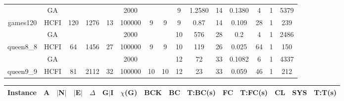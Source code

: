 \documentclass[10pt]{article}
\begin{document}
\begin{center}
\begin{table}[H]
\begin{tabular}{|c|c|c|c|c|c|c|c|c|c|c|c|c|c|c|}
	&GA&       &                   &                     &2000         &     \cellcolor{yellow} & {\cellcolor{yellow}}& {{\cellcolor{green}9}}
&1.2580   &14        &0.1380                   & 4                   &1          &5379        \\ \cline{2-2} \cline{6-6} \cline{9-15}
 \multirow{-2}{*}{games120} &HCFI   &\multirow{-2}{*}{120}   &\multirow{-2}{*}{1276}     &\multirow{-2}{*}{13}     &100000     &\multirow{-2}{*}{\cellcolor{yellow}9}      & \multirow{-2}{*}{\cellcolor{yellow}9}    &{\cellcolor{green}9}     &0.87         &14    &0.109         &28    &1     &239        \\ \hline \hline
	&GA&       &                   &                     &2000         &     \cellcolor{yellow} & {\cellcolor{yellow}}& {{\cellcolor{green}10}}
& 576  & 28       & 0.2                  &4                    & 1         &2486         \\ \cline{2-2} \cline{6-6} \cline{9-15}
 \multirow{-2}{*}{queen8\_8} &HCFI   &\multirow{-2}{*}{64}   &\multirow{-2}{*}{1456}     &\multirow{-2}{*}{27}     &100000     &\multirow{-2}{*}{\cellcolor{yellow}9}      & \multirow{-2}{*}{\cellcolor{yellow}9}    &{\cellcolor{green}10}     &119         &26    &0.025         &64    &1     &150        \\ \hline \hline
	&GA&       &                   &                     &2000         &     \cellcolor{yellow} & {\cellcolor{yellow}}& {{\cellcolor{green}12}}
&72   &33        &0.1082                   &  6                   &1          &4337         \\ \cline{2-2} \cline{6-6} \cline{9-15}
 \multirow{-2}{*}{queen9\_9} &HCFI   &\multirow{-2}{*}{81}   &\multirow{-2}{*}{2112}     &\multirow{-2}{*}{32}     &100000     &\multirow{-2}{*}{\cellcolor{yellow}10}      & \multirow{-2}{*}{\cellcolor{yellow}10}    &{\cellcolor{green}12}     &23        &33     &0.059         &46    & 1    & 212       \\ \hline 
\end{tabular}
\end{table}
\begin{table}[H]
\begin{tabular}{|c|c|c|c|c|c|c|c|c|c|c|c|c|c|c|}
\hline
Instance& A &$|$N$|$ & $|$E$|$ & $\Delta$ & G$|$I & $\chi$(G) &BCK&BC & T:BC(s) & FC & T:FC(s) & CL & SYS & T:T(s) \\ \hline \hline


\end{tabular}
\end{table}
\end{center}
\end{document}
